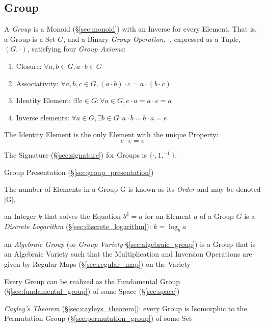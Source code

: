 


\subsection{Group}\label{sec:group}

A \emph{Group} is a Monoid (\S\ref{sec:monoid}) with an Inverse for every
Element. That is, a Group is a Set $G$, and a Binary \emph{Group Operation},
$\cdot$, expressed as a Tuple, $(G,\cdot)$, satisfying four \emph{Group Axioms}:
\begin{enumerate}
    \item Closure: $\forall a,b \in G, a \cdot b \in G$
    \item Associativity: $\forall a,b,c \in G, (a \cdot b) \cdot c = a
      \cdot (b \cdot c)$
    \item Identity Element: $\exists! e \in G : \forall a \in G,
      e \cdot a = a \cdot e = a$
    \item Inverse elements: $\forall a \in G, \exists b \in G :
      a \cdot b = b \cdot a = e$
\end{enumerate}
The Identity Element is the only Element with the unique Property:
\[
    e \cdot e = e
\]

The Signature (\S\ref{sec:signature}) for Groups is $\{\cdot, 1, ^{-1}\}$.

\fist Group Presentation (\S\ref{sec:group_presentation})

The number of Elements in a Group $\mathrm{G}$ is known as its \emph{Order} and
may be denoted $|\mathrm{G}|$.

an Integer $k$ that solves the Equation $b^k = a$ for an Element $a$ of a Group
$G$ is a \emph{Discrete Logarithm} (\S\ref{sec:discrete_logarithm}): $k = \log_b
a$

\fist an \emph{Algebraic Group} (or \emph{Group Variety}
\S\ref{sec:algebraic_group}) is a Group that is an Algebraic Variety such that
the Multiplication and Inversion Operations are given by Regular Maps
(\S\ref{sec:regular_map}) on the Variety

Every Group can be realized as the Fundamental Group
(\S\ref{sec:fundamental_group}) of some Space (\S\ref{sec:space})

\emph{Cayley's Theorem} (\S\ref{sec:cayleys_theorem}): every Group is Isomorphic
to the Permutation Group (\S\ref{sec:permutation_group}) of some Set

